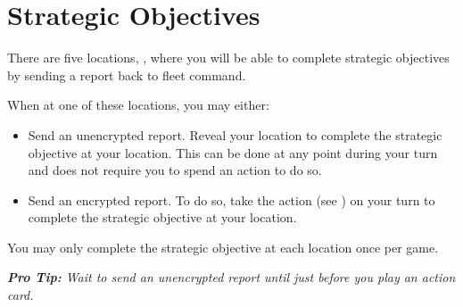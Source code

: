 \section*{Strategic Objectives}
There are five locations, \sansA{} \sansE{} \sansM{} \sansV{} \sansZ{}, where you will be able to complete strategic objectives by sending a report back to fleet command.

When at one of these locations, you may either:
\begin{itemize}[leftmargin=*]
	\item Send an unencrypted report. Reveal your location to complete the strategic objective at your location. This can be done at any point during your turn and does not require you to spend an action to do so.
	\item Send an encrypted report. To do so, take the \ENCRYPT{} action (see {}) on your turn to complete the strategic objective at your location.
\end{itemize}

You may only complete the strategic objective at each location once per game.

\textit{\textbf{Pro Tip:} Wait to send an unencrypted report until just before you play an action card.}

